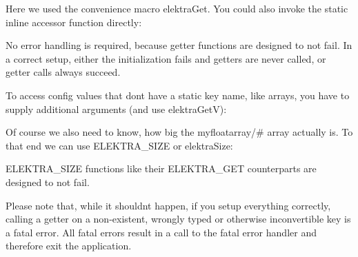 \begin{DoxyCode}{0}
\end{DoxyCode}


Here we used the convenience macro {\ttfamily elektra\+Get}. You could also invoke the {\ttfamily static inline} accessor function directly\+:


\begin{DoxyCode}{0}
\end{DoxyCode}


No error handling is required, because getter functions are designed to not fail. In a correct setup, either the initialization fails and getters are never called, or getter calls always succeed.

To access config values that don\textquotesingle{}t have a static key name, like arrays, you have to supply additional arguments (and use {\ttfamily elektra\+GetV})\+:


\begin{DoxyCode}{0}
\DoxyCodeLine{\textcolor{comment}{// or}}
\end{DoxyCode}


Of course we also need to know, how big the {\ttfamily myfloatarray/\#} array actually is. To that end we can use {\ttfamily E\+L\+E\+K\+T\+R\+A\+\_\+\+S\+I\+ZE} or {\ttfamily elektra\+Size}\+:


\begin{DoxyCode}{0}
\DoxyCodeLine{\textcolor{comment}{// or}}
\end{DoxyCode}


{\ttfamily E\+L\+E\+K\+T\+R\+A\+\_\+\+S\+I\+ZE} functions like their {\ttfamily E\+L\+E\+K\+T\+R\+A\+\_\+\+G\+ET} counterparts are designed to not fail.

Please note that, while it shouldn\textquotesingle{}t happen, if you setup everything correctly, calling a getter on a non-\/existent, wrongly typed or otherwise inconvertible key is a fatal error. All fatal errors result in a call to the fatal error handler and therefore exit the application.


